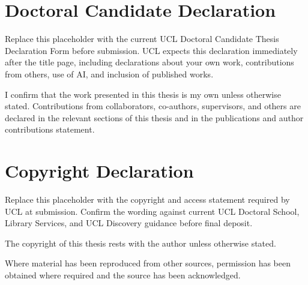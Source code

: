 \cleardoublepage{}
{}\mtcaddchapter 
\chapter*{Doctoral Candidate Declaration}
\addtocounter{counter}{-1}

{\color{ThesisAccentText}Replace this placeholder with the current UCL Doctoral Candidate Thesis Declaration Form before submission. UCL expects this declaration immediately after the title page, including declarations about your own work, contributions from others, use of AI, and inclusion of published works.}

I confirm that the work presented in this thesis is my own unless otherwise stated. Contributions from collaborators, co-authors, supervisors, and others are declared in the relevant sections of this thesis and in the publications and author contributions statement.


\cleardoublepage{}
{}\mtcaddchapter 
\chapter*{Copyright Declaration}
\addtocounter{counter}{-1}



{\color{ThesisAccentText}Replace this placeholder with the copyright and access statement required by UCL at submission. Confirm the wording against current UCL Doctoral School, Library Services, and UCL Discovery guidance before final deposit.}

The copyright of this thesis rests with the author unless otherwise stated.

Where material has been reproduced from other sources, permission has been obtained where required and the source has been acknowledged.
